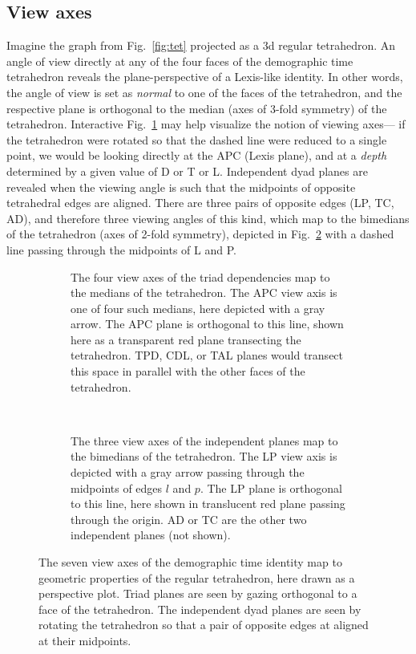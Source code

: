 \documentclass{bmcart}
\begin{document}
\subsection*{View axes}
\label{sec:viewaxes}
Imagine the graph from Fig.~\ref{fig:tet} projected as a 3d regular tetrahedron. An angle of view directly at any of the four faces of the demographic time tetrahedron reveals the plane-perspective of a Lexis-like identity. In other words, the angle of view is set as \emph{normal} to one of the faces of the tetrahedron, and the respective plane is orthogonal to the median  (axes of 3-fold symmetry) of the tetrahedron. Interactive Fig.~\ref{fig:depviewaxes} may help visualize the notion of viewing axes--- if the tetrahedron were rotated so that the dashed line were reduced to a single point, we would be looking directly at the APC (Lexis plane), and at a \emph{depth} determined by a given value of D or T or L. Independent dyad planes are revealed when the viewing angle is such that the midpoints of opposite tetrahedral edges are aligned. There are three pairs of opposite edges (LP, TC, AD), and therefore three viewing angles of this kind, which map to the bimedians of the tetrahedron (axes of 2-fold symmetry), depicted in Fig.~\ref{fig:indepviewaxes} with a dashed line passing through the midpoints of L and P.

\begin{figure}
\begin{subfigure}[t]{0.45\linewidth}
    \centering
    \resizebox{\linewidth}{\linewidth}{
    
    }
    \caption{The four view axes of the triad dependencies map to the medians of the tetrahedron. The APC view axis is one of four such medians, here depicted with a gray arrow. The APC plane is orthogonal to this line, shown here as a transparent red plane transecting the tetrahedron. TPD, CDL, or TAL planes would transect this space in parallel with the other faces of the tetrahedron.}
    \label{fig:depviewaxes}
\end{subfigure}
~~
\begin{subfigure}[t]{0.45\linewidth}
    \resizebox{\linewidth}{\linewidth}{
     
     }
    \caption{The three view axes of the independent planes map to the bimedians of the tetrahedron. The LP view axis is depicted with a gray arrow passing through the midpoints of edges $l$ and $p$. The LP plane is orthogonal to this line, here shown in translucent red plane passing through the origin. AD or TC are the other two independent planes (not shown).}
    \label{fig:indepviewaxes}       
\end{subfigure}
\caption{The seven view axes of the demographic time identity map to geometric properties of the regular tetrahedron, here drawn as a perspective plot. Triad planes are seen by gazing orthogonal to a face of the tetrahedron. The independent dyad planes are seen by rotating the tetrahedron so that a pair of opposite edges at aligned at their midpoints. }
\label{fig:viewaxes}
\end{figure}
\end{document}
